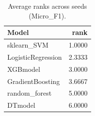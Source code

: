 \begin{table}[t]
\centering
\begin{tabular}{lr}
\toprule
Model & rank \\
\midrule
sklearn_SVM & 1.0000 \\
LogisticRegression & 2.3333 \\
XGBmodel & 3.0000 \\
GradientBoosting & 3.6667 \\
random_forest & 5.0000 \\
DTmodel & 6.0000 \\
\bottomrule
\end{tabular}
\caption{Average ranks across seeds (Micro_F1).}
\label{tab:avg_rank_Micro_F1}
\end{table}